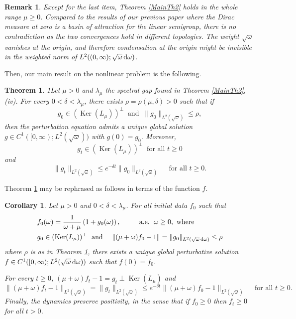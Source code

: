 \documentclass[reqno,11pt,letterpaper]{amsart}
\numberwithin{equation}{section}
\newcommand{\dd}{\, {\rm d}}
\newtheorem{theorem}{Theorem}
\newtheorem{corollary}[proposition]{Corollary}
\newtheorem{remark}{Remark}
\begin{document}
\begin{remark} \label{rem:comparison_with_JFA}
Except for the last item, Theorem \ref{MainTh2} holds in the whole range $\mu\geq0$. Compared to the results of our previous paper \cite{EscMenegaki26} where the Dirac measure at zero is a basin of attraction for the linear semigroup, there is no contradiction as 
the two convergences hold in different topologies. The weight
$\sqrt{\omega}$ vanishes at the origin, and therefore condensation at the origin might be invisible in the weighted norm of $L^2((0,\infty);\sqrt{\omega}\dd\omega)$.
\end{remark} 

Then, our main result on the nonlinear problem is the following.
\begin{theorem}
1\label{MainTh}
Let $\mu>0$ and $\lambda_\mu$ the spectral gap found in Theorem \ref{MainTh2}, (iv). For every $0<\delta<\lambda_\mu$, there exists 
$\rho = \rho(\mu,\delta)>0$ such that if 
  $$ g_0 \in (\operatorname{Ker}(L_\mu))^\perp\  \text{ and } \  \|g_0\|_{L^2(\sqrt{\omega})} \leq \rho,$$ then the perturbation equation  admits a unique global solution $g \in C^1( [0,\infty);L^2(\sqrt{\omega}))$ with   $g(0)=g_0$. 
    Moreover, $$g_t \in (\operatorname{Ker}(L_\mu))^\perp \ \text{ for all } t\geq 0 $$ and
    \begin{equation}
        \|g_t\|_{L^2(\sqrt{\omega})} \leq e^{- \delta t} \|g_0\|_{L^2(\sqrt{\omega})} \quad \text{ for all } t\geq 0.
    \end{equation}
\end{theorem}

Theorem \ref{MainTh} may be rephrased as follows in terms of the function $f$.

\begin{corollary}
\label{MainThB} 
Let $\mu>0$ and $0<\delta<\lambda_\mu$. 
For all initial data $f_0$ such that
\begin{align*}
&f_0(\omega )=\frac{1}{\omega + \mu}
\left(1+g_0(\omega) \right),\,\,\qquad \text{ a.e. }\, \omega \ge 0, \text{ where } \\
&g_0\in(\operatorname{Ker}(L_\mu))^\perp \ \text{ and }\quad \|(\mu +\omega )f_0-1\| = \|g_0\|_{L^2(\sqrt \omega \dd \omega )}\le \rho 
\end{align*}
where $\rho$ is as in Theorem \ref{MainTh}, there exists a unique global perturbative solution 
$f \in C^1( [0,\infty);L^2(\sqrt{\omega}\dd \omega))$ such that $f(0)=f_0$. 

For every $t\geq 0$, $(\mu +\omega )f_t-1 = g_t \perp \operatorname{Ker}(L_\mu)$ and
    \begin{equation}
      \|(\mu +\omega )f_t -1\|_{L^2(\sqrt{\omega})}=  \|g_t\|_{L^2(\sqrt{\omega})} \leq e^{- \delta t} \|(\mu +\omega )f_0-1\|_{L^2(\sqrt{\omega})} \quad \text{ for all } t\geq 0.
    \end{equation}
Finally, the dynamics preserve positivity, in the sense that if $f_0\geq 0$ then $f_t\geq 0$ for all $t>0$. 
\end{corollary}
\end{document}
